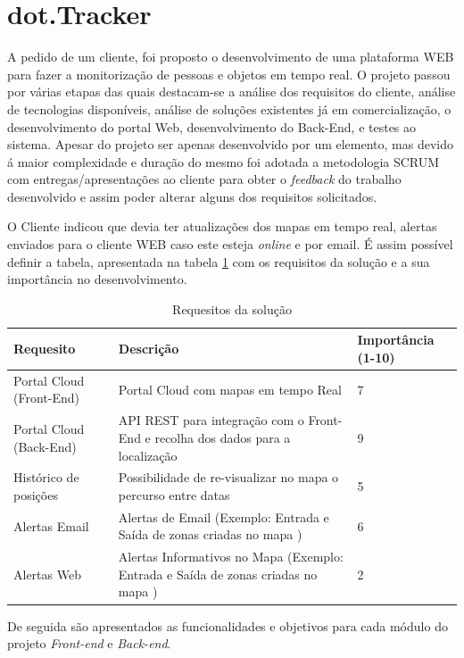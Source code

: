 \section {dot.Tracker}
\par
A pedido de um cliente, foi proposto o desenvolvimento de uma plataforma WEB para fazer a monitorização de pessoas e objetos em tempo real. O projeto passou por várias etapas das quais destacam-se a análise dos requisitos do cliente, análise de tecnologias disponíveis, análise de soluções existentes já em comercialização, o desenvolvimento do portal Web, desenvolvimento do Back-End, e testes ao sistema. Apesar do projeto ser apenas desenvolvido por um elemento, mas devido á maior complexidade e duração do mesmo foi adotada a metodologia SCRUM com entregas/apresentações ao cliente para obter o \textit{feedback} do trabalho desenvolvido e assim poder alterar alguns dos requisitos solicitados.
\par O Cliente indicou que devia ter atualizações dos mapas em tempo real, alertas enviados para o cliente WEB caso este esteja \textit{online} e por email.
É assim possível definir a tabela, apresentada na tabela \ref{tab1} com os requisitos da solução e a sua importância no desenvolvimento.

\begin{table}[htb]
\centering
\caption{Requesitos da solução}\label{tab1}
\begin{tabular}{|p{3cm}|p{8cm}|p{2cm}|}\hline
Requesito&Descrição&Importância (1-10)\\\hline

Portal Cloud (Front-End)&Portal Cloud com mapas em tempo Real& 7\\\hline
Portal Cloud (Back-End) & API REST para integração com o Front-End e recolha dos dados para a localização &9\\\hline
Histórico de posições&Possibilidade de re-visualizar no mapa o percurso entre datas&5\\\hline
Alertas Email&Alertas de Email (Exemplo: Entrada e Saída de zonas criadas no mapa )&6\\\hline
Alertas Web&Alertas Informativos no Mapa (Exemplo: Entrada e Saída de zonas criadas no mapa )&2\\\hline
\end{tabular} 
\end{table}

\par
De seguida são apresentados as funcionalidades e objetivos para cada módulo do projeto \textit{Front-end} e \textit {Back-end}.

